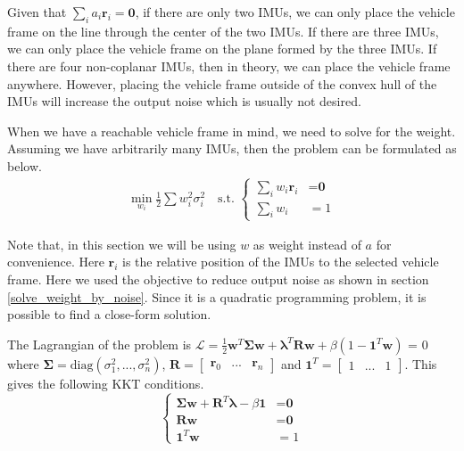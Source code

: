 \documentclass[conference]{IEEEtran}
\begin{document}
Given that $\sum_i{a_i \textbf{r}_i} = \textbf{0}$, if there are only two IMUs, we can only place the vehicle frame on the line through the center of the two IMUs. If there are three IMUs, we can only place the vehicle frame on the plane formed by the three IMUs. If there are four non-coplanar IMUs, then in theory, we can place the vehicle frame anywhere. However, placing the vehicle frame outside of the convex hull of the IMUs will increase the output noise which is usually not desired.

When we have a reachable vehicle frame in mind, we need to solve for the weight. Assuming we have arbitrarily many IMUs, then the problem can be formulated as below.
\begin{equation}
\begin{split}
    \min_{w_i}{\frac{1}{2} \sum{w_i^2 \sigma_i^2}} \quad \text{s.t. }
    \begin{cases}
      \sum_i{w_i \textbf{r}_i} &= \textbf{0} \\
      \sum_i{w_i} &= 1
    \end{cases}
\end{split}
\end{equation}

Note that, in this section we will be using $w$ as weight instead of $a$ for convenience. Here $\textbf{r}_i$ is the relative position of the IMUs to the selected vehicle frame. Here we used the objective to reduce output noise as shown in section \ref{solve_weight_by_noise}. Since it is a quadratic programming problem, it is possible to find a close-form solution.

The Lagrangian of the problem is $\mathcal{L} = \frac{1}{2}\textbf{w}^T \bm{\Sigma} \textbf{w} + \bm{\lambda}^T \textbf{R}\textbf{w} + \beta \left( 1 - \textbf{1}^T \textbf{w} \right)$ = 0 where $\bm{\Sigma} = \text{diag}(\sigma_1^2, ..., \sigma_n^2)$, $\textbf{R} = \left[\begin{matrix} \textbf{r}_0 & ... & \textbf{r}_n\end{matrix}\right]$ and $\textbf{1}^T = \left[\begin{matrix}1 & ... & 1\end{matrix}\right]$. This gives the following KKT conditions.
\begin{equation}
\begin{cases}
  \bm{\Sigma}\textbf{w} + \textbf{R}^T \bm{\lambda} - \beta \textbf{1} &= \textbf{0} \\
  \textbf{R} \textbf{w} &= \textbf{0} \\
  \textbf{1}^T \textbf{w} &= 1
\end{cases}
\end{equation}
\end{document}
